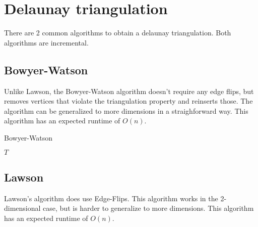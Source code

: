 \section{Delaunay triangulation}
\label{sec:triangulation}

There are 2 common algorithms to obtain a delaunay triangulation.
Both algorithms are incremental.

\subsection{Bowyer-Watson}
\label{sub:bowyer_watson}

Unlike Lawson, the Bowyer-Watson algorithm doesn't require any edge flips, but removes vertices that violate the triangulation property and reinserts those.
The algorithm can be generalized to more dimensions in a straighforward way.
This algorithm has an expected runtime of $O(n)$.
\cite{shewchuk}

\begin{algorithm}
    \caption{Bowyer-Watson}
    \begin{algorithmic}
            \EndFor
            \Return $T$
        \EndFunction
    \end{algorithmic}
\end{algorithm}


\subsection{Lawson}
\label{sub:lawson}

Lawson's algorithm does use Edge-Flips.
This algorithm works in the 2-dimensional case, but is harder to generalize to more dimensions.
This algorithm has an expected runtime of $O(n)$.
\cite{shewchuk}

